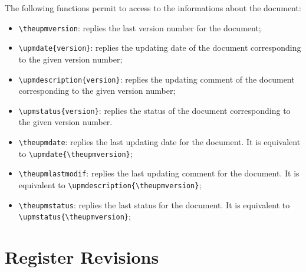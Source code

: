 \documentclass[book]{upmethodology-document}
\begin{document}
The following functions permit to access to the informations about the document:
\begin{itemize}
\item \texttt{{\textbackslash}theupmversion}: replies the last version number for the document;

\item \texttt{{\textbackslash}upmdate\{version\}}: replies the updating date of the document corresponding to the given version number;

\item \texttt{{\textbackslash}upmdescription\{version\}}: replies the updating comment of the document corresponding to the given version number;

\item \texttt{{\textbackslash}upmstatus\{version\}}: replies the status of the document corresponding to the given version number.

\item \texttt{{\textbackslash}theupmdate}: replies the last updating date for the document. It is equivalent to \texttt{{\textbackslash}upmdate\{{\textbackslash}theupmversion\}};

\item \texttt{{\textbackslash}theupmlastmodif}: replies the last updating comment for the document. It is equivalent to \texttt{{\textbackslash}upmdescription\{{\textbackslash}theupmversion\}};

\item \texttt{{\textbackslash}theupmstatus}: replies the last status for the document. It is equivalent to \texttt{{\textbackslash}upmstatus\{{\textbackslash}theupmversion\}};
\end{itemize}

\section{Register Revisions}
\end{document}

